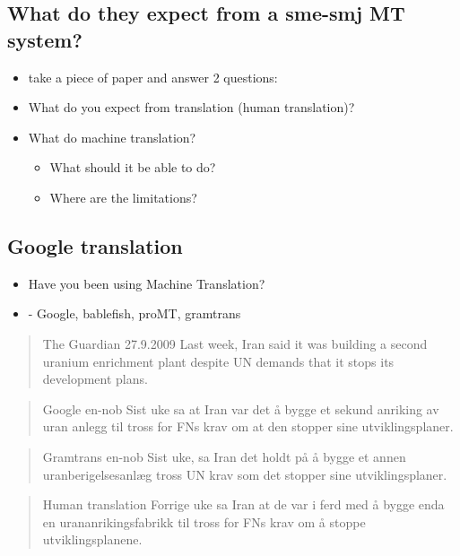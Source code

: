 \documentclass[a4paper,english,12pt]{article}
\begin{document}
\begin{spacing}{1.0}
\subsection{What do they expect from a sme-smj MT system?}
\begin{itemize}
\item take a piece of paper and answer 2 questions:
\item What do you expect from translation (human translation)?
\item What do machine translation?
    \begin{itemize}
        \item What should it be able to do?
        \item Where are the limitations?
    \end{itemize}
\end{itemize}

\subsection{Google translation}
\begin{itemize}
    \item Have you been using Machine Translation? 
    \item - Google, bablefish, proMT, gramtrans
\end{itemize}


\begin{quote}
The Guardian 27.9.2009
Last week, Iran said it was building a second uranium enrichment plant despite UN demands that it stops its development plans.
\end{quote}

\begin{quote}
Google en-nob
Sist uke sa at Iran var det å bygge et sekund anriking av uran anlegg til tross for FNs krav om at den stopper sine utviklingsplaner.
\end{quote}

\begin{quote}
Gramtrans en-nob
Sist uke, sa Iran det holdt på å bygge et annen uranberigelsesanlæg tross UN krav som det stopper sine utviklingsplaner.
\end{quote}


\begin{quote}
Human translation
Forrige uke sa Iran at de var i ferd med å bygge enda en urananrikingsfabrikk til tross for FNs krav om å stoppe utviklingsplanene.
\end{quote}


\end{spacing}
\end{document}
